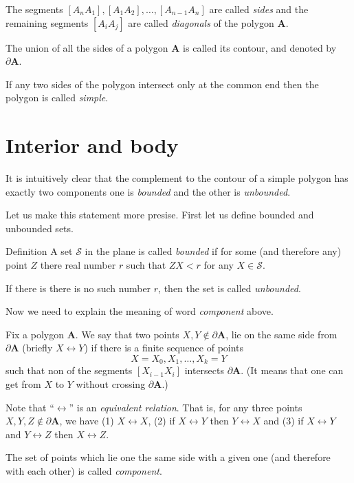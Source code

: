 The segments $[A_nA_1],[A_1A_2],\dots,[A_{n-1} A_n]$
are called \emph{sides} and the remaining segments $[A_iA_j]$ are called \emph{diagonals} of the polygon $\bm{A}$.

The union of all the sides of a polygon $\bm{A}$ is called its contour,
and denoted by $\partial \bm{A}$.

If any two sides of the polygon 
intersect only at the common end 
then the polygon is called  \emph{simple}.

\section*{Interior and body}

It is intuitively clear that 
the complement to the contour of a simple polygon
has exactly two components 
one is \emph{bounded} 
and the other is \emph{unbounded}. 

Let us make this statement more presise.
First let us define bounded and unbounded sets.

\begin{thm}{Definition}
A set $\mathcal{S}$ in the plane 
is called \emph{bounded} 
if for some (and therefore any) point $Z$ 
there real number $r$ such that $ZX<r$ for any $X\in \mathcal{S}$.

If there is there is no such number $r$, 
then the set is called \emph{unbounded}.
\end{thm}

Now we need to explain the meaning of word \emph{component} above. 

Fix a polygon $\bm{A}$.
We say that two points $X,Y\notin \partial \bm{A}$,
lie
on the same side from $\partial\bm{A}$ (briefly $X\leftrightarrow Y$)
if there is a finite sequence of points
\[X=X_0, X_1,\dots, X_k=Y\]
such that non of the segments $[X_{i-1}X_i]$ intersects $\partial\bm{A}$.
(It means that one can get from $X$ to $Y$ without crossing $\partial\bm{A}$.)

Note that ``$\leftrightarrow$'' is an \emph{equivalent relation}.
That is, 
for any three points $X,Y,Z\notin\partial \bm{A}$,
we have 
(1) $X\leftrightarrow X$,
(2) if $X\leftrightarrow Y$
then  $Y\leftrightarrow X$
and 
(3) if $X\leftrightarrow Y$ 
and $Y\leftrightarrow Z$ 
then  $X\leftrightarrow Z$.

The set of points which lie one the same side with a given one (and therefore with each other) is called \emph{component}.

